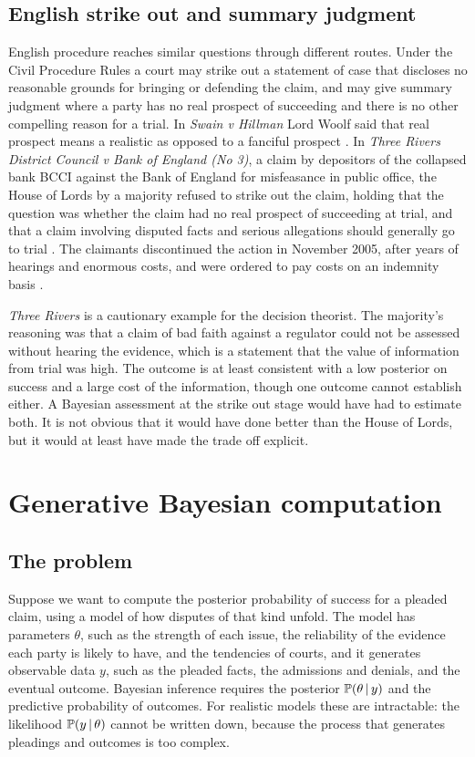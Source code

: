 \subsection{English strike out and summary judgment}

English procedure reaches similar questions through different routes. Under the Civil Procedure Rules a court may strike out a statement of case that discloses no reasonable grounds for bringing or defending the claim, and may give summary judgment where a party has no real prospect of succeeding and there is no other compelling reason for a trial. In \emph{Swain v Hillman} Lord Woolf said that real prospect means a realistic as opposed to a fanciful prospect \citep{swain2001}. In \emph{Three Rivers District Council v Bank of England (No 3)}, a claim by depositors of the collapsed bank BCCI against the Bank of England for misfeasance in public office, the House of Lords by a majority refused to strike out the claim, holding that the question was whether the claim had no real prospect of succeeding at trial, and that a claim involving disputed facts and serious allegations should generally go to trial \citep{threerivers2001}. The claimants discontinued the action in November 2005, after years of hearings and enormous costs, and were ordered to pay costs on an indemnity basis \citep{threerivers2006}.

\emph{Three Rivers} is a cautionary example for the decision theorist. The majority's reasoning was that a claim of bad faith against a regulator could not be assessed without hearing the evidence, which is a statement that the value of information from trial was high. The outcome is at least consistent with a low posterior on success and a large cost of the information, though one outcome cannot establish either. A Bayesian assessment at the strike out stage would have had to estimate both. It is not obvious that it would have done better than the House of Lords, but it would at least have made the trade off explicit.

\section{Generative Bayesian computation}

\subsection{The problem}

Suppose we want to compute the posterior probability of success for a pleaded claim, using a model of how disputes of that kind unfold. The model has parameters $\theta$, such as the strength of each issue, the reliability of the evidence each party is likely to have, and the tendencies of courts, and it generates observable data $y$, such as the pleaded facts, the admissions and denials, and the eventual outcome. Bayesian inference requires the posterior $\mathbb{P}(\theta \,\vert\, y)$ and the predictive probability of outcomes. For realistic models these are intractable: the likelihood $\mathbb{P}(y\,\vert\,\theta)$ cannot be written down, because the process that generates pleadings and outcomes is too complex.

